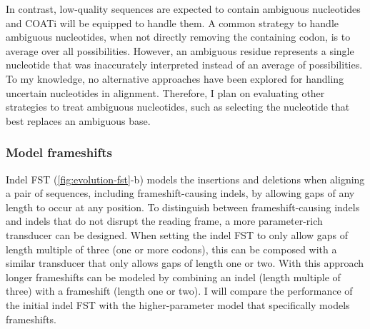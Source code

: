 In contrast, low-quality sequences are expected to contain ambiguous nucleotides
and COATi will be equipped to handle them.
A common strategy to handle ambiguous nucleotides, when not directly removing the
containing codon, is to average over all possibilities.
However, an ambiguous residue represents a single nucleotide that was
inaccurately interpreted instead of an average of possibilities.
To my knowledge, no alternative approaches have been explored for handling
uncertain nucleotides in alignment.
Therefore, I plan on evaluating other strategies to treat ambiguous nucleotides,
such as selecting the nucleotide that best replaces an ambiguous base.

\subsubsection{Model frameshifts}



Indel FST (\ref{fig:evolution-fst}-b) models the insertions and deletions when
aligning a pair of sequences, including frameshift-causing indels, by allowing
gaps of any length to occur at any position.
To distinguish between frameshift-causing indels and indels that do not disrupt
the reading frame, a more parameter-rich transducer can be designed.
When setting the indel FST to only allow gaps of length multiple of three (one
or more codons), this can be composed with a similar transducer that only
allows gaps of length one or two.
With this approach longer frameshifts can be modeled by combining an indel
(length multiple of three) with a frameshift (length one or two).
I will compare the performance of the initial indel FST with the
higher-parameter model that specifically models frameshifts.

